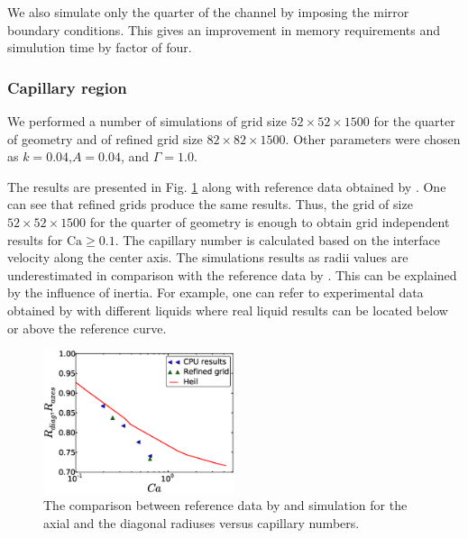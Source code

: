 \documentclass{CFD2011}
\newcommand{\Ca}{\mathrm{Ca}}
\begin{document}
We also simulate only the quarter of the channel by imposing the mirror boundary conditions. This
gives an improvement in memory requirements and simulution time by factor of four.  
\subsubsection{Capillary region}
We performed a number of simulations of grid size $52\times52\times 1500$ for the
quarter of geometry and of refined grid size $82\times82\times 1500$. Other parameters were
chosen as
$k=0.04$,$A=0.04$, and $\Gamma=1.0$. 

The results are presented in Fig.
\ref{fig:capillary:comparison:3d} along with reference data obtained by \citet{heil-threedim}. One
can see that refined grids produce the same results. Thus, the grid of size $52\times52\times 1500$
for the quarter of geometry is enough to obtain grid independent results for $\Ca\geq0.1$. The
capillary number is calculated based on the interface velocity along the center axis. The
simulations results as radii values are underestimated in comparison with the reference data by
\citet{heil-threedim}. This can be explained by the influence of inertia. For example, one can refer
to experimental data obtained by \citet{shikazono-square} with different liquids where real liquid
results can be located below or above the reference curve.
\begin{figure}
\includegraphics[width=0.5\textwidth]{Figures/capillaries_comparison_3d.eps}
\caption{The comparison between reference data by \citet{heil-threedim} and simulation for the axial
and the diagonal radiuses
versus capillary numbers. \label{fig:capillary:comparison:3d}}
\end{figure}
\end{document}
